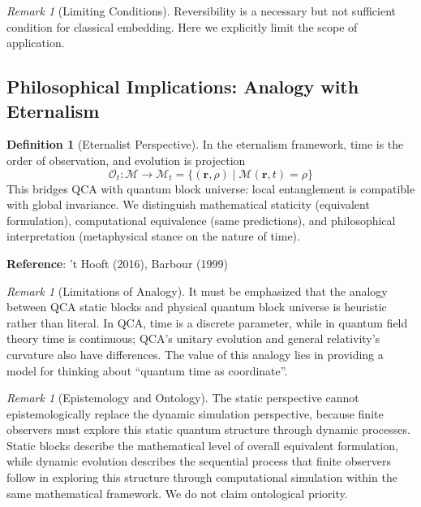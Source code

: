 \documentclass[11pt]{article}
\theoremstyle{definition}
\newtheorem{definition}[theorem]{Definition}
\theoremstyle{remark}
\newtheorem{remark}[theorem]{Remark}
\begin{document}
\begin{remark}[Limiting Conditions]
Reversibility is a necessary but not sufficient condition for classical embedding. Here we explicitly limit the scope of application.
\end{remark}

\subsection{Philosophical Implications: Analogy with Eternalism}

\begin{definition}[Eternalist Perspective]\label{def:qeternal}
In the eternalism framework, time is the order of observation, and evolution is projection
\[
\mathcal{O}_t: \mathcal{M} \to \mathcal{M}_t = \{ (\mathbf{r}, \rho) \mid \mathcal{M}(\mathbf{r}, t) = \rho \}
\]
This bridges QCA with quantum block universe: local entanglement is compatible with global invariance. We distinguish mathematical staticity (equivalent formulation), computational equivalence (same predictions), and philosophical interpretation (metaphysical stance on the nature of time).

\textbf{Reference}: 't Hooft (2016), Barbour (1999)
\end{definition}

\begin{remark}[Limitations of Analogy]
It must be emphasized that the analogy between QCA static blocks and physical quantum block universe is heuristic rather than literal. In QCA, time is a discrete parameter, while in quantum field theory time is continuous; QCA's unitary evolution and general relativity's curvature also have differences. The value of this analogy lies in providing a model for thinking about ``quantum time as coordinate''.
\end{remark}

\begin{remark}[Epistemology and Ontology]
The static perspective cannot epistemologically replace the dynamic simulation perspective, because finite observers must explore this static quantum structure through dynamic processes. Static blocks describe the mathematical level of overall equivalent formulation, while dynamic evolution describes the sequential process that finite observers follow in exploring this structure through computational simulation within the same mathematical framework. We do not claim ontological priority.
\end{remark}
\end{document}
